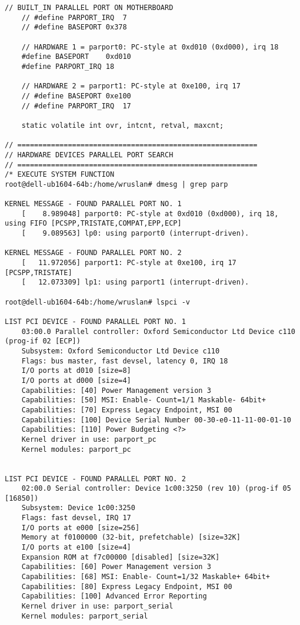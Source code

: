 \begin{lstlisting}[caption={App4-Full C-Code listing for Real Time (RTAI)}, label=App4-Full C-Code listing for Real Time (RTAI)]
	// BUILT_IN PARALLEL PORT ON MOTHERBOARD
	// #define PARPORT_IRQ	7
	// #define BASEPORT	0x378
	
	// HARDWARE 1 = parport0: PC-style at 0xd010 (0xd000), irq 18
	#define BASEPORT	0xd010
	#define PARPORT_IRQ	18

	// HARDWARE 2 = parport1: PC-style at 0xe100, irq 17
	// #define BASEPORT	0xe100
	// #define PARPORT_IRQ	17

	static volatile int ovr, intcnt, retval, maxcnt;

// =========================================================
// HARDWARE DEVICES PARALLEL PORT SEARCH
// =========================================================
/* EXECUTE SYSTEM FUNCTION
root@dell-ub1604-64b:/home/wruslan# dmesg | grep parp

KERNEL MESSAGE - FOUND PARALLEL PORT NO. 1
	[    8.989048] parport0: PC-style at 0xd010 (0xd000), irq 18, using FIFO [PCSPP,TRISTATE,COMPAT,EPP,ECP]
	[    9.089563] lp0: using parport0 (interrupt-driven).
	
KERNEL MESSAGE - FOUND PARALLEL PORT NO. 2
	[   11.972056] parport1: PC-style at 0xe100, irq 17 [PCSPP,TRISTATE]
	[   12.073309] lp1: using parport1 (interrupt-driven).

root@dell-ub1604-64b:/home/wruslan# lspci -v

LIST PCI DEVICE - FOUND PARALLEL PORT NO. 1
	03:00.0 Parallel controller: Oxford Semiconductor Ltd Device c110 (prog-if 02 [ECP])
	Subsystem: Oxford Semiconductor Ltd Device c110
	Flags: bus master, fast devsel, latency 0, IRQ 18
	I/O ports at d010 [size=8]
	I/O ports at d000 [size=4]
	Capabilities: [40] Power Management version 3
	Capabilities: [50] MSI: Enable- Count=1/1 Maskable- 64bit+
	Capabilities: [70] Express Legacy Endpoint, MSI 00
	Capabilities: [100] Device Serial Number 00-30-e0-11-11-00-01-10
	Capabilities: [110] Power Budgeting <?>
	Kernel driver in use: parport_pc
	Kernel modules: parport_pc

	
LIST PCI DEVICE - FOUND PARALLEL PORT NO. 2
	02:00.0 Serial controller: Device 1c00:3250 (rev 10) (prog-if 05 [16850])
	Subsystem: Device 1c00:3250
	Flags: fast devsel, IRQ 17
	I/O ports at e000 [size=256]
	Memory at f0100000 (32-bit, prefetchable) [size=32K]
	I/O ports at e100 [size=4]
	Expansion ROM at f7c00000 [disabled] [size=32K]
	Capabilities: [60] Power Management version 3
	Capabilities: [68] MSI: Enable- Count=1/32 Maskable+ 64bit+
	Capabilities: [80] Express Legacy Endpoint, MSI 00
	Capabilities: [100] Advanced Error Reporting
	Kernel driver in use: parport_serial
	Kernel modules: parport_serial


\end{lstlisting}
